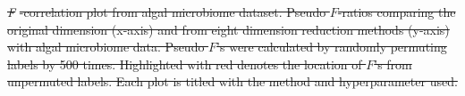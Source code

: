 \documentclass[11pt]{article}
\newcommand{\1}{{\rm 1}\kern-0.24em{\rm I}}
\providecommand{\DIFdeltex}[1]{{\protect\color{red}\sout{#1}}}                      %
\providecommand{\DIFdelbegin}{} %
\providecommand{\DIFdelend}{} %
\providecommand{\DIFdelFL}[1]{\DIFdel{#1}} %
\providecommand{\DIFdel}[1]{\texorpdfstring{\DIFdeltex{#1}}{}} %
\newcommand{\DIFscaledelfig}{0.5}
\newlength{\DIFdelgraphicswidth} %
\newlength{\DIFdelgraphicsheight} %
\newcommand{\DIFdelincludegraphics}[2][]{%
\sbox{\DIFdelgraphicsbox}{\DIFOincludegraphics[#1]{#2}}%
\settoboxwidth{\DIFdelgraphicswidth}{\DIFdelgraphicsbox} %
\settoboxtotalheight{\DIFdelgraphicsheight}{\DIFdelgraphicsbox} %
\scalebox{\DIFscaledelfig}{%
\parbox[b]{\DIFdelgraphicswidth}{\usebox{\DIFdelgraphicsbox}\\[-\baselineskip] \rule{\DIFdelgraphicswidth}{0em}}\llap{\resizebox{\DIFdelgraphicswidth}{\DIFdelgraphicsheight}{%
\setlength{\unitlength}{\DIFdelgraphicswidth}%
\begin{picture}(1,1)%
\thicklines\linethickness{2pt} %
{\color[rgb]{1,0,0}\put(0,0){\framebox(1,1){}}}%
{\color[rgb]{1,0,0}\put(0,0){\line( 1,1){1}}}%
{\color[rgb]{1,0,0}\put(0,1){\line(1,-1){1}}}%
\end{picture}%
}\hspace*{3pt}}} %
} %
\DeclareRobustCommand{\DIFdelbegin}{\DIFOdelbegin \let\includegraphics\DIFdelincludegraphics} %
\DeclareRobustCommand{\DIFdelend}{\DIFOaddend \let\includegraphics\DIFOincludegraphics} %
\begin{document}
\DIFdelbegin %
{%
\textit{\DIFdelFL{F}}%
\DIFdelFL{-correlation plot from algal microbiome dataset. Pseudo $F$-ratios comparing the original dimension (x-axis) and from eight dimension reduction methods (y-axis) with algal microbiome data. Pseudo $F$'s were calculated by randomly permuting labels by 500 times. Highlighted with red denotes the location of $F$'s from unpermuted labels. Each plot is titled with the method and hyperparameter used.}}
\DIFdelend %
\end{document}
